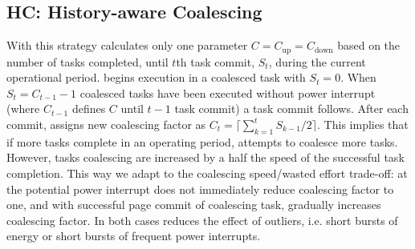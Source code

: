 
\subsection{HC: History-aware Coalescing}

With this strategy \sys calculates only one parameter $C=C_\text{up}=C_\text{down}$ based on the number of tasks completed, until $t$th task commit, $S_t$, during the current operational period. \sys begins execution in a coalesced task with $S_t=0$. When $S_t=C_{t-1}-1$ coalesced tasks have been executed without power interrupt (where $C_{t-1}$ defines $C$ until $t-1$ task commit) a task commit follows. After each commit, \sys assigns new coalescing factor as $C_{t}=\lceil \sum_{k=1}^{t}S_{k-1}/2\rceil$. This implies that if more tasks complete in an operating period, \sys attempts to coalesce more tasks. However, tasks coalescing are increased by a half the speed of the successful task completion. This way we adapt to the coalescing speed/wasted effort trade-off: at the potential power interrupt \sys does not immediately reduce coalescing factor to one, and with successful page commit of coalescing task, \sys gradually increases coalescing factor. In both cases \sys reduces the effect of outliers, i.e. short bursts of energy or short bursts of frequent power interrupts.


